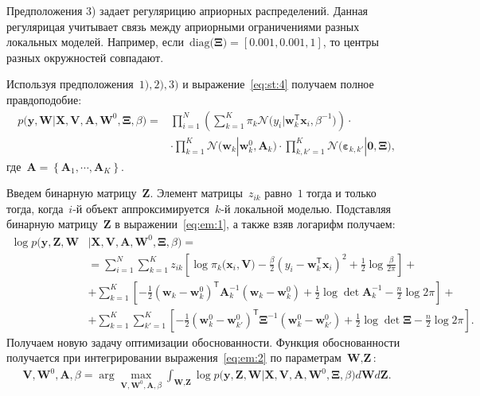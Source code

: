 \documentclass[12pt, twoside]{article}
\numberwithin{equation}{section}
\begin{document}
Предположения 3) задает регулярицию априорных распределений. Данная регулярицая учитывает связь между априорными ограничениями разных локальных моделей. Например, если~$\text{diag}\bigr(\bm{\Xi}\bigr)=[0.001, 0.001, 1]$, то  центры разных окружностей совпадают.

Используя предположения~$1), 2), 3)$ и выражение~\eqref{eq:st:4} получаем полное правдоподобие:
\[
\label{eq:em:1}
\begin{aligned}
p\bigr(\mathbf{y}, \mathbf{W}|\mathbf{X}, \mathbf{V}, \textbf{A}, \textbf{W}^{0}, \bm{\Xi}, \beta\bigr) = &\prod_{i=1}^{N}\left(\sum_{k=1}^{K}\pi_{k}\mathcal{N}\bigr(y_{i}|\mathbf{w}_{k}^{\mathsf{T}}\mathbf{x}_{i}, \beta^{-1}\bigr)\right)\cdot\\
&\cdot\prod_{k=1}^{K}\mathcal{N}\bigr(\mathbf{w}_{k}|\mathbf{w}^{0}_{k}, \mathbf{A}_{k}\bigr)\cdot\prod_{k,k'=1}^{K}\mathcal{N}\bigr(\bm{\varepsilon}_{k,k'}|\mathbf{0},  \bm{\Xi}\bigr),
\end{aligned}
\]
 где~$\mathbf{A} = \left\{\mathbf{A}_1, \cdots, \mathbf{A}_K\right\}.$
 
Введем бинарную матрицу~$\mathbf{Z}$. Элемент матрицы~$z_{ik}$ равно~$1$ тогда и только тогда, когда~$i$-й объект аппроксимируется~$k$-й локальной моделью.
Подставляя бинарную матрицу~$\mathbf{Z}$ в выражении~\eqref{eq:em:1}, а также взяв логарифм получаем:
\[
\label{eq:em:2}
\begin{aligned}
\log p\bigr(\mathbf{y}, \mathbf{Z}, \mathbf{W}&|\mathbf{X}, \mathbf{V}, \textbf{A}, \textbf{W}^{0},  \bm{\Xi}, \beta\bigr) =\\
&= \sum_{i=1}^{N}\sum_{k=1}^{K}z_{ik}\left[\log\pi_k\bigr(\textbf{x}_i, \textbf{V}\bigr) - \frac{\beta}{2}\left(y_{i} - \textbf{w}_{k}^{\mathsf{T}}\textbf{x}_{i}\right)^{2} + \frac{1}{2}\log\frac{\beta}{2\pi}\right] +\\
&+ \sum_{k=1}^{K}\left[-\frac{1}{2}\left(\textbf{w}_{k} - \textbf{w}_{k}^{0}\right)^{\mathsf{T}}\textbf{A}_{k}^{-1}\left(\textbf{w}_{k} - \textbf{w}_{k}^{0}\right) + \frac{1}{2}\log\det\textbf{A}^{-1}_{k} - \frac{n}{2}\log2\pi\right]+\\
&+ \sum_{k=1}^{K}\sum_{k'=1}^{K}\left[-\frac{1}{2}\left(\textbf{w}_{k}^{0}-\textbf{w}_{k'}^{0}\right)^{\mathsf{T}}\bm{\Xi}^{-1}\left(\textbf{w}_{k}^{0}-\textbf{w}_{k'}^{0}\right) +\frac{1}{2}\log\det \bm{\Xi} -\frac{n}{2}\log{2\pi}\right].
\end{aligned}
\]
Получаем новую задачу оптимизации обоснованности. Функция обоснованности получается при интегрировании выражения~\eqref{eq:em:2} по параметрам~$\textbf{W}, \textbf{Z}$:
\[
\label{eq:em:3}
\begin{aligned}
\mathbf{V}, \mathbf{W}^0, \textbf{A},  \beta = \arg\max_{\mathbf{V}, \mathbf{W}^0, \textbf{A}, \beta} \int_{\textbf{W}, \textbf{Z}}\log p\bigr(\mathbf{y}, \textbf{Z}, \textbf{W}|\mathbf{X}, \mathbf{V}, \textbf{A}, \textbf{W}^{0}, \bm{\Xi}, \beta\bigr)d\textbf{W}d\textbf{Z}.
\end{aligned}
\]
\end{document}
